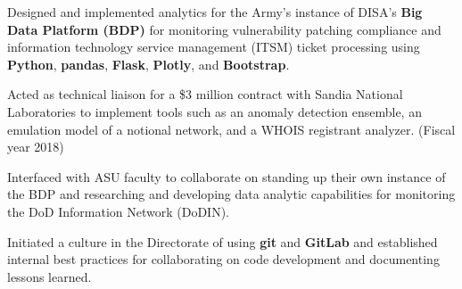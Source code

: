 


\begin{rExperience}

  \item Designed and implemented analytics for the Army's instance of DISA's \textbf{Big Data Platform (BDP)} %
    for monitoring vulnerability patching compliance and information technology service management (ITSM) ticket
    processing using \textbf{Python}, \textbf{pandas}, \textbf{Flask}, \textbf{Plotly}, and \textbf{Bootstrap}.

  \item Acted as technical liaison for a \$3 million contract with Sandia National Laboratories to implement tools such
    as an anomaly detection ensemble, an emulation model of a notional network, and a WHOIS registrant analyzer. (Fiscal
    year 2018)

  \item Interfaced with ASU faculty to collaborate on standing up their own instance of the BDP and researching and
    developing data analytic capabilities for monitoring the DoD Information Network (DoDIN).

  \item Initiated a culture in the Directorate of using \textbf{git} and \textbf{GitLab} and established internal best
    practices for collaborating on code development and documenting lessons learned.

\end{rExperience}
